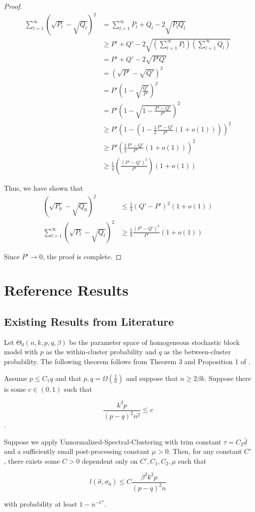 \documentclass{article}
\begin{document}
\begin{proof}
\begin{align*}
\sum_{l=1}^\infty (\sqrt{P_l}  - \sqrt{Q_l})^2 &= \sum_{l=1}^\infty P_l + Q_l - 2 \sqrt{P_lQ_l} \\
 &\geq P' + Q' - 2 \sqrt{ \left( \sum_{l=1}^\infty P_l \right) \left( \sum_{l=1}^\infty Q_l \right) } \\
 &= P' + Q' - 2\sqrt{P' Q'} \\
 &= (\sqrt{P'} - \sqrt{Q'})^2 \\
 &= P' \left( 1 - \sqrt{ \frac{Q'}{P'} } \right)^2 \\ 
 &= P' \left( 1 - \sqrt{ 1 - \frac{P' - Q'}{P'} } \right)^2 \\
 &\geq P' \left( 1 - ( 1 - \frac{1}{2} \frac{P' - Q'}{P'} (1 + o(1)) ) \right)^2 \\
 &\geq P' \left( \frac{1}{2} \frac{P' - Q'}{P'} (1 + o(1)) \right)^2 \\
 &\geq \frac{1}{4} \left( \frac{(P' - Q')^2}{P'} \right) (1 + o(1)) 
\end{align*}

Thus, we have shown that 
\begin{align*}
(\sqrt{P_0} - \sqrt{Q_0})^2& \leq \frac{1}{4} (Q' - P')^2 (1 + o(1)) \\
\sum_{l=1}^\infty (\sqrt{P_l} - \sqrt{Q_l})^2 & \geq \frac{1}{4} \frac{(P' - Q')^2}{P'} (1 + o(1))
\end{align*}

Since $P' \rightarrow 0$, the proof is complete.

\end{proof}

\section{Reference Results}

\subsection{Existing Results from Literature}

Let $\Theta_0(n, k, p, q, \beta)$ be the parameter space of homogeneous stochastic block model with $p$ as the within-cluster probability and $q$ as the between-cluster probability. The following theorem follows from Theorem 3 and Proposition 1 of \cite{gao2015achieving}. 

\begin{theorem}
\label{thm:spectral_rate}
Assume $p \leq C_1 q$ and that $p, q = \Omega( \frac{1}{n} )$ and suppose that $n \geq 2 \beta k$. Suppose there is some $c \in (0,1)$ such that 

$$ \frac{k^3 p}{(p-q)^2 n^2} \leq c$$. 

Suppose we apply Unnormalized-Spectral-Clustering with trim constant $\tau = C_2 \bar{d}$ and a sufficiently small post-processing constant $\mu > 0$. Then, for any constant $C'$, there exists some $C > 0$ dependent only on $C', C_1, C_2, \mu$ such that

\[
l(\hat{\sigma}, \sigma_0) \leq C \frac{\beta^2 k^2 p}{(p-q)^2 n }
\]

with probability at least $1 - n^{-C'}$. 

\end{theorem}
\end{document}
